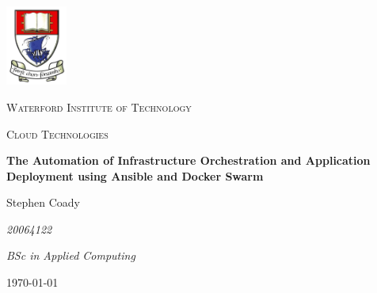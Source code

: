 \begin{titlepage}
	\centering
	\includegraphics[width=0.15\textwidth]{components/images/wit}\par\vspace{1cm}
	{\scshape\LARGE Waterford Institute of Technology \par}
	\vspace{1cm}
	{\scshape\Large Cloud Technologies\par}
	\vspace{1.5cm}
	{\huge\bfseries The Automation of Infrastructure Orchestration and Application Deployment using Ansible and Docker Swarm\par}
	\vspace{2cm}
	{\Large Stephen Coady\par}
	{\Large\itshape 20064122\par}	
	{\Large\itshape BSc in Applied Computing\par}


	\vfill

	{\large \today\par}
\end{titlepage}
